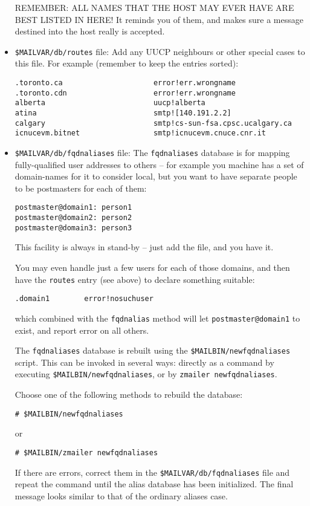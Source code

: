 \begin{itemize}
REMEMBER: ALL NAMES THAT THE HOST MAY EVER HAVE ARE BEST LISTED
IN HERE!  It reminds you of them, and makes sure a message
destined into the host really is accepted.
\item {\tt \$MAILVAR/db/routes} file: Add any UUCP neighbours or other special cases to this file.  For
example (remember to keep the entries sorted):
\begin{verbatim}
.toronto.ca                     error!err.wrongname
.toronto.cdn                    error!err.wrongname
alberta                         uucp!alberta
atina                           smtp![140.191.2.2]
calgary                         smtp!cs-sun-fsa.cpsc.ucalgary.ca
icnucevm.bitnet                 smtp!icnucevm.cnuce.cnr.it
\end{verbatim}
\item {\tt \$MAILVAR/db/fqdnaliases} file: The {\tt fqdnaliases} database is for mapping fully-qualified user
addresses to others -- for example you machine has a set of
domain-names for it to consider local, but you want to have
separate people to be postmasters for each of them:
\begin{verbatim}
postmaster@domain1: person1
postmaster@domain2: person2
postmaster@domain3: person3
\end{verbatim}

This facility is always in stand-by -- just add the file, and
you have it.

You may even handle just a few users for each of those domains, and
then have the {\tt routes} entry (see above) to declare something suitable:
\begin{verbatim}
.domain1        error!nosuchuser
\end{verbatim}

which combined with the {\tt fqdnalias} method will let {\tt postmaster@domain1}
to exist, and report error on all others.

The {\tt fqdnaliases} database is rebuilt using the {\tt \$MAILBIN/newfqdnaliases}
script.  This can be invoked in several ways: directly as a command
by executing {\tt \$MAILBIN/newfqdnaliases}, or by {\tt zmailer newfqdnaliases}.

Choose one of the following methods to rebuild the database:
\begin{verbatim}
# $MAILBIN/newfqdnaliases
\end{verbatim}

or
\begin{verbatim}
# $MAILBIN/zmailer newfqdnaliases
\end{verbatim}


If there are errors, correct them in the {\tt \$MAILVAR/db/fqdnaliases} file
and repeat the command until the alias database has been initialized.
The final message looks similar to that of the ordinary aliases case.
\end{itemize}





